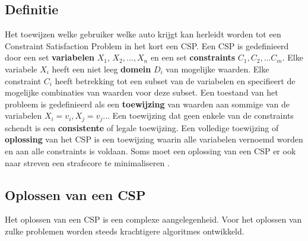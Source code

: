 \subsection{Definitie}
Het toewijzen welke gebruiker welke auto krijgt kan herleidt worden tot een Constraint Satisfaction Problem in het kort een CSP. Een CSP is gedefinieerd door een set \textbf{variabelen} $X_{1}$, $X_{2},...,X_{n}$ en een set \textbf{constraints} $C_{1}, C_{2},...C_{m}$. Elke variabele $X_{i}$ heeft een niet leeg \textbf{domein} $D_{i}$ van mogelijke waarden. Elke constraint $C_{i}$ heeft betrekking tot een subset van de variabelen en specifieert de mogelijke combinaties van waarden voor deze subset. Een toestand van het probleem is gedefinieerd als een \textbf{toewijzing} van waarden aan sommige van de variabelen $X_{i} =  v_{i}, X_{j} = v_{j}$... Een toewijzing dat geen enkele van de constraints schendt is een \textbf{consistente} of legale toewijzing. Een volledige toewijzing of \textbf{oplossing} van het CSP is een toewijzing waarin alle variabelen vernoemd worden en aan alle constraints is voldaan. Soms moet een oplossing van een CSP er ook naar streven een strafscore te minimaliseren \autocite{norvig}.

\subsection{Oplossen van een CSP}
Het oplossen van een CSP is een complexe aangelegenheid. Voor het oplossen van zulke problemen worden steeds krachtigere algoritmes ontwikkeld.